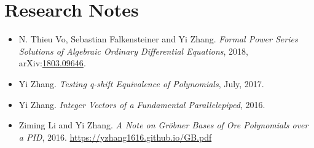 \documentclass[a4paper,12pt]{article}
\begin{document}
% 
% 

\section*{\Large{Research Notes}}
\begin{itemize}
\item N. Thieu Vo, Sebastian Falkensteiner and Yi Zhang.
 {\em Formal Power Series Solutions of Algebraic Ordinary Differential Equations}, 
 2018, arXiv:\href{https://arxiv.org/abs/1803.09646}{1803.09646}.
\item Yi Zhang. {\em Testing q-shift Equivalence of Polynomials}, July, 2017.
\item Yi Zhang. {\em Integer Vectors of a Fundamental Parallelepiped}, 2016.
 \item Ziming Li and Yi Zhang. {\em A Note on Gr\"{o}bner Bases of Ore Polynomials over a PID}, 2016. 
 \url{https://yzhang1616.github.io/GB.pdf} 
\end{itemize}
\end{document}
